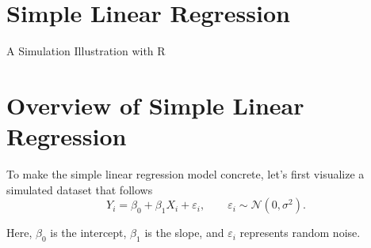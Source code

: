 \documentclass[
  letterpaper,
]{scrbook}
\newenvironment{Shaded}{\begin{snugshade}}{\end{snugshade}}
\newcommand{\AttributeTok}[1]{\textcolor[rgb]{0.40,0.45,0.13}{#1}}
\newcommand{\ConstantTok}[1]{\textcolor[rgb]{0.56,0.35,0.01}{#1}}
\newcommand{\DecValTok}[1]{\textcolor[rgb]{0.68,0.00,0.00}{#1}}
\newcommand{\FunctionTok}[1]{\textcolor[rgb]{0.28,0.35,0.67}{#1}}
\newcommand{\NormalTok}[1]{\textcolor[rgb]{0.00,0.23,0.31}{#1}}
\newcommand{\SpecialCharTok}[1]{\textcolor[rgb]{0.37,0.37,0.37}{#1}}
\newcommand{\StringTok}[1]{\textcolor[rgb]{0.13,0.47,0.30}{#1}}
\begin{document}
\section{Simple Linear Regression}\label{simple-linear-regression}

A Simulation Illustration with R

\hfill\break

\begin{Shaded}
\end{Shaded}

\section{Overview of Simple Linear
Regression}\label{overview-of-simple-linear-regression}

To make the simple linear regression model concrete, let's first
visualize a simulated dataset that follows \[
Y_i = \beta_0 + \beta_1 X_i + \varepsilon_i, \qquad
\varepsilon_i \sim \mathcal N(0, \sigma^2).
\]

Here, \(\beta_0\) is the intercept, \(\beta_1\) is the slope, and
\(\varepsilon_i\) represents random noise.
\end{document}
